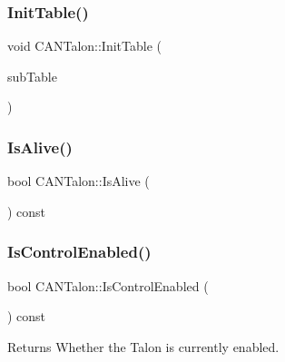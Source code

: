 \subsubsection{\texorpdfstring{Init\+Table()}{InitTable()}}
{\footnotesize\ttfamily void C\+A\+N\+Talon\+::\+Init\+Table (\begin{DoxyParamCaption}\item[{std\+::shared\+\_\+ptr$<$ I\+Table $>$}]{sub\+Table }\end{DoxyParamCaption})\hspace{0.3cm}{\ttfamily [override]}}

\mbox{\label{class_c_a_n_talon_a4d26bc07e4d13a3292be1b9152439182}} 
\subsubsection{\texorpdfstring{Is\+Alive()}{IsAlive()}}
{\footnotesize\ttfamily bool C\+A\+N\+Talon\+::\+Is\+Alive (\begin{DoxyParamCaption}{ }\end{DoxyParamCaption}) const\hspace{0.3cm}{\ttfamily [override]}}

\mbox{\label{class_c_a_n_talon_a6369d85290e29a12b6521f6f6f04cbf0}} 
\subsubsection{\texorpdfstring{Is\+Control\+Enabled()}{IsControlEnabled()}}
{\footnotesize\ttfamily bool C\+A\+N\+Talon\+::\+Is\+Control\+Enabled (\begin{DoxyParamCaption}{ }\end{DoxyParamCaption}) const}

\begin{DoxyReturn}{Returns}
Whether the Talon is currently enabled. 
\end{DoxyReturn}
\mbox{\label{class_c_a_n_talon_a33ae2a0684d9655145fdff51dc57a032}} 
